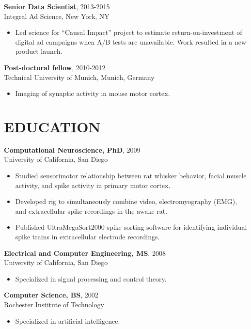 \documentclass[line,10pt]{res}
\begin{document}
\begin{resume}
 {\bf Senior Data Scientist}, 2013-2015 \\ Integral Ad Science, New York, NY 
  \begin{itemize}
          \item[] Led science for ``Causal Impact'' project to estimate return-on-investment of digital ad campaigns when A/B tests are unavailable. Work resulted in a new product launch.
        \end{itemize}

 {\bf Post-doctoral fellow}, 2010-2012 \\ Technical University of Munich, Munich, Germany 
  \begin{itemize}
          \item[] Imaging of synaptic activity in mouse motor cortex.
        \end{itemize}


\section{EDUCATION}
\vspace{5pt}
 {\bf Computational Neuroscience, PhD}, 2009 \\  University of California, San Diego
  \begin{itemize}
          \item[] Studied sensorimotor relationship between rat whisker behavior, facial muscle activity, and spike activity in primary motor cortex. 
          \item[] Developed rig to simultaneously combine video, electromyography (EMG), and extracellular spike recordings in the awake rat.
          \item[] Published UltraMegaSort2000 spike sorting software for identifying individual spike trains in extracellular electrode recordings.
   \end{itemize}

 {\bf Electrical and Computer Engineering, MS}, 2008 \\ University of California, San Diego
  \begin{itemize}
          \item[] Specialized in signal processing and control theory.
   \end{itemize}

 {\bf Computer Science, BS}, 2002 \\ Rochester Institute of Technology
   \begin{itemize}
          \item[] Specialized in artificial intelligence.
   \end{itemize}


\end{resume}
\end{document}
